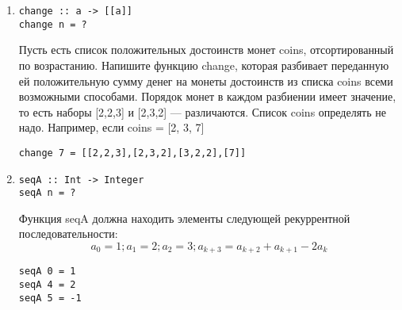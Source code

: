 \documentclass[a4paper,10pt]{article}
\begin{document}
\begin{enumerate}
\item {
\begin{lstlisting}
change :: a -> [[a]]
change n = ?
\end{lstlisting}
Пусть есть список положительных достоинств монет coins, отсортированный по возрастанию.
Напишите функцию change, которая разбивает переданную ей положительную сумму денег на монеты
достоинств из списка coins всеми возможными способами.
Порядок монет в каждом разбиении имеет значение, то есть наборы [2,2,3] и [2,3,2] — различаются.
Список coins определять не надо.
Например, если coins = [2, 3, 7]
\begin{lstlisting}
change 7 = [[2,2,3],[2,3,2],[3,2,2],[7]]
\end{lstlisting}
}

\item {
\begin{lstlisting}
seqA :: Int -> Integer
seqA n = ?
\end{lstlisting}
Функция seqA должна находить элементы следующей рекуррентной последовательности:
$$a_0 = 1; a_1 = 2; a_2 = 3; a_{k+3} = a_{k+2} + a_{k+1} - 2a_k$$
\begin{lstlisting}
seqA 0 = 1
seqA 4 = 2
seqA 5 = -1
\end{lstlisting}
}

\end{enumerate}
\end{document}
